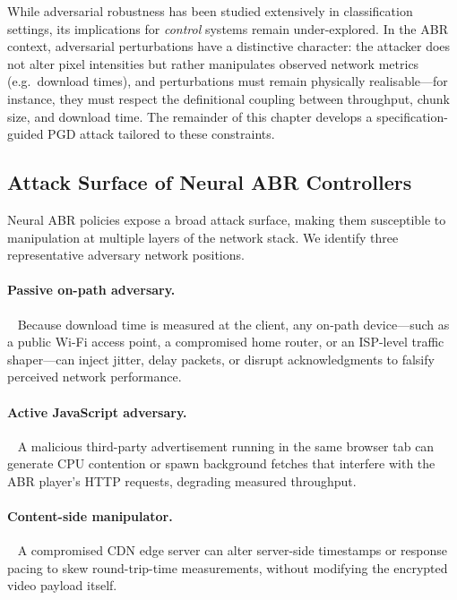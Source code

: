 \documentclass[thesis]{uofithesis} %
\begin{document}
    While adversarial robustness has been studied extensively in
    classification settings, its implications for \emph{control} systems
    remain under-explored.
    In the ABR context, adversarial perturbations have a distinctive
    character: the attacker does not alter pixel intensities but rather
    manipulates observed network metrics (e.g.\ download times), and
    perturbations must remain physically realisable---for instance, they
    must respect the definitional coupling between throughput, chunk size,
    and download time.
    The remainder of this chapter develops a specification-guided PGD
    attack tailored to these constraints.
    
    
    \subsection{Attack Surface of Neural ABR Controllers}
    \label{sec:attack-surface}
    
    Neural ABR policies expose a broad attack surface, making them
    susceptible to manipulation at multiple layers of the network stack.
    We identify three representative adversary network positions.
    
    \paragraph{Passive on-path adversary.}~\cite{on-path}
    Because download time is measured at the client, any on-path
    device---such as a public Wi-Fi access point, a compromised home
    router, or an ISP-level traffic shaper---can inject jitter, delay
    packets, or disrupt acknowledgments to falsify perceived network
    performance.
    
    \paragraph{Active JavaScript adversary.}~\cite{js-attack}
    A malicious third-party advertisement running in the same browser tab
    can generate CPU contention or spawn background fetches that interfere
    with the ABR player's HTTP requests, degrading measured throughput.
    
    \paragraph{Content-side manipulator.}~\cite{cdn-attack}
    A compromised CDN edge server can alter server-side timestamps or
    response pacing to skew round-trip-time measurements, without modifying
    the encrypted video payload itself.
    
\end{document}
